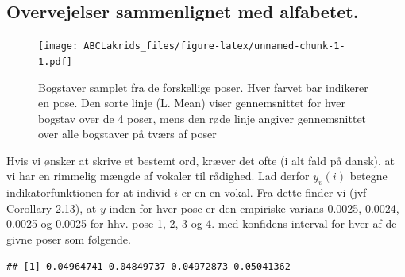 \documentclass[]{article}
\newenvironment{Shaded}{\begin{snugshade}}{\end{snugshade}}
\newcommand{\KeywordTok}[1]{\textcolor[rgb]{0.13,0.29,0.53}{\textbf{#1}}}
\newcommand{\DecValTok}[1]{\textcolor[rgb]{0.00,0.00,0.81}{#1}}
\newcommand{\StringTok}[1]{\textcolor[rgb]{0.31,0.60,0.02}{#1}}
\newcommand{\CommentTok}[1]{\textcolor[rgb]{0.56,0.35,0.01}{\textit{#1}}}
\newcommand{\OtherTok}[1]{\textcolor[rgb]{0.56,0.35,0.01}{#1}}
\newcommand{\OperatorTok}[1]{\textcolor[rgb]{0.81,0.36,0.00}{\textbf{#1}}}
\newcommand{\NormalTok}[1]{#1}
\begin{document}
\subsection{Overvejelser sammenlignet med
alfabetet.}\label{overvejelser-sammenlignet-med-alfabetet.}

\begin{figure}
\centering
\texttt{[image: ABCLakrids\_files/figure-latex/unnamed-chunk-1-1.pdf]}
\caption{\label{fig:figs} Bogstaver samplet fra de forskellige poser.
Hver farvet bar indikerer en pose. Den sorte linje (L. Mean) viser
gennemsnittet for hver bogstav over de 4 poser, mens den røde linje
angiver gennemsnittet over alle bogstaver på tværs af poser}
\end{figure}

Hvis vi ønsker at skrive et bestemt ord, kræver det ofte (i alt fald på
dansk), at vi har en rimmelig mængde af vokaler til rådighed. Lad derfor
\(y_v(i)\) betegne indikatorfunktionen for at individ \(i\) er en en
vokal. Fra dette finder vi (jvf Corollary 2.13), at \(\bar y\) inden for
hver pose er den empiriske varians 0.0025, 0.0024, 0.0025 og 0.0025 for
hhv. pose 1, 2, 3 og 4. med konfidens interval for hver af de givne
poser som følgende.

\begin{Shaded}
\end{Shaded}

\begin{verbatim}
## [1] 0.04964741 0.04849737 0.04972873 0.05041362
\end{verbatim}
\end{document}
